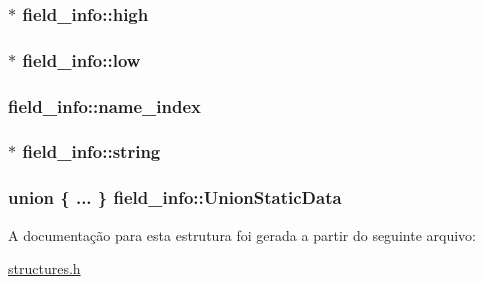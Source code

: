 \subsubsection[{\texorpdfstring{high}{high}}]{$\ast$ field\+\_\+info\+::high}\hypertarget{structfield__info_aa97ac1ab148b4dd06a21a0ab3d972209}{}\label{structfield__info_aa97ac1ab148b4dd06a21a0ab3d972209}
\subsubsection[{\texorpdfstring{low}{low}}]{$\ast$ field\+\_\+info\+::low}\hypertarget{structfield__info_a578a358c12b99b512974ff10295582be}{}\label{structfield__info_a578a358c12b99b512974ff10295582be}
\subsubsection[{\texorpdfstring{name\+\_\+index}{name_index}}]{ field\+\_\+info\+::name\+\_\+index}\hypertarget{structfield__info_a425e3ae85badd81c67ef00acca85ad9e}{}\label{structfield__info_a425e3ae85badd81c67ef00acca85ad9e}
\subsubsection[{\texorpdfstring{string}{string}}]{$\ast$ field\+\_\+info\+::string}\hypertarget{structfield__info_a3628f44d66536cd28d270a4ec12514f3}{}\label{structfield__info_a3628f44d66536cd28d270a4ec12514f3}
\subsubsection[{\texorpdfstring{Union\+Static\+Data}{UnionStaticData}}]{\setlength{\rightskip}{0pt plus 5cm}union \{ ... \}  field\+\_\+info\+::\+Union\+Static\+Data}\hypertarget{structfield__info_ad4f7c1536ad2cd1fe84816c97d2ce373}{}\label{structfield__info_ad4f7c1536ad2cd1fe84816c97d2ce373}


A documentação para esta estrutura foi gerada a partir do seguinte arquivo\+:\begin{DoxyCompactItemize}
\item 
\hyperlink{structures_8h}{structures.\+h}\end{DoxyCompactItemize}
